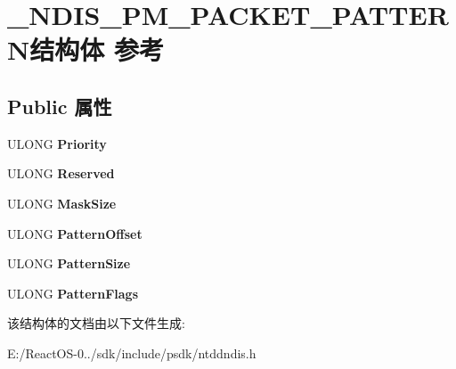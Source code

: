 \hypertarget{struct___n_d_i_s___p_m___p_a_c_k_e_t___p_a_t_t_e_r_n}{}\section{\+\_\+\+N\+D\+I\+S\+\_\+\+P\+M\+\_\+\+P\+A\+C\+K\+E\+T\+\_\+\+P\+A\+T\+T\+E\+R\+N结构体 参考}
\label{struct___n_d_i_s___p_m___p_a_c_k_e_t___p_a_t_t_e_r_n}
\subsection*{Public 属性}
\begin{DoxyCompactItemize}
\item 
\mbox{\label{struct___n_d_i_s___p_m___p_a_c_k_e_t___p_a_t_t_e_r_n_a947855498f17c5ab5f982045743e1290}} 
U\+L\+O\+NG {\bfseries Priority}
\item 
\mbox{\label{struct___n_d_i_s___p_m___p_a_c_k_e_t___p_a_t_t_e_r_n_a6ca828cb3eced70e88c22b9e3c3de9e4}} 
U\+L\+O\+NG {\bfseries Reserved}
\item 
\mbox{\label{struct___n_d_i_s___p_m___p_a_c_k_e_t___p_a_t_t_e_r_n_a219734bd6c7e5b388347e1aa8b7612a8}} 
U\+L\+O\+NG {\bfseries Mask\+Size}
\item 
\mbox{\label{struct___n_d_i_s___p_m___p_a_c_k_e_t___p_a_t_t_e_r_n_aaa692c056019d8b2470f74444f3df803}} 
U\+L\+O\+NG {\bfseries Pattern\+Offset}
\item 
\mbox{\label{struct___n_d_i_s___p_m___p_a_c_k_e_t___p_a_t_t_e_r_n_ac5541f3639b8f95959e708a66da70409}} 
U\+L\+O\+NG {\bfseries Pattern\+Size}
\item 
\mbox{\label{struct___n_d_i_s___p_m___p_a_c_k_e_t___p_a_t_t_e_r_n_a1087d9324a2a68ddfbf9aba49911319d}} 
U\+L\+O\+NG {\bfseries Pattern\+Flags}
\end{DoxyCompactItemize}


该结构体的文档由以下文件生成\+:\begin{DoxyCompactItemize}
\item 
E\+:/\+React\+O\+S-\/0../sdk/include/psdk/ntddndis.\+h\end{DoxyCompactItemize}
